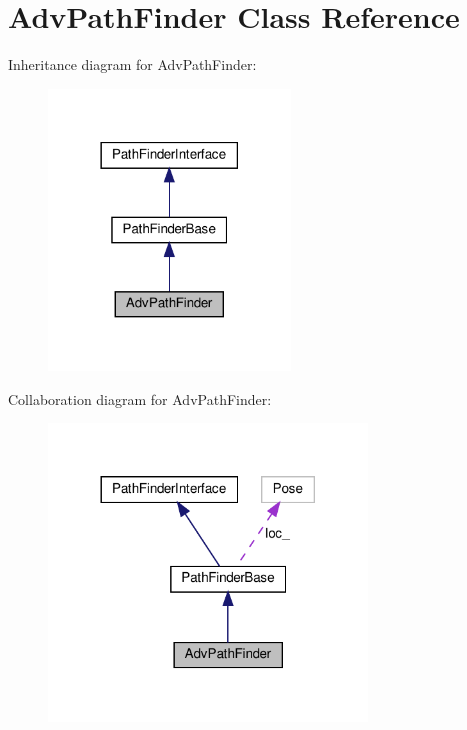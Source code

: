 \hypertarget{classAdvPathFinder}{}\section{Adv\+Path\+Finder Class Reference}
\label{classAdvPathFinder}


Inheritance diagram for Adv\+Path\+Finder\+:\nopagebreak
\begin{figure}[H]
\begin{center}
\leavevmode
\includegraphics[width=182pt]{classAdvPathFinder__inherit__graph}
\end{center}
\end{figure}


Collaboration diagram for Adv\+Path\+Finder\+:\nopagebreak
\begin{figure}[H]
\begin{center}
\leavevmode
\includegraphics[width=240pt]{classAdvPathFinder__coll__graph}
\end{center}
\end{figure}
